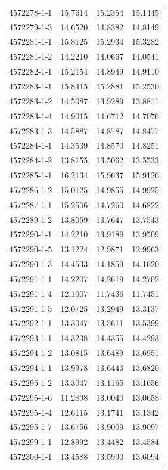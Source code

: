 \begin{longtable}{lrrr}
4572278-1-1 & 15.7614 & 15.2354 & 15.1445 \\
4572279-1-3 & 14.6520 & 14.8382 & 14.8149 \\
4572281-1-1 & 15.8125 & 15.2934 & 15.3282 \\
4572281-1-2 & 14.2210 & 14.0667 & 14.0541 \\
4572282-1-1 & 15.2154 & 14.8949 & 14.9110 \\
4572283-1-1 & 15.8415 & 15.2881 & 15.2530 \\
4572283-1-2 & 14.5087 & 13.9289 & 13.8811 \\
4572283-1-4 & 14.9015 & 14.6712 & 14.7076 \\
4572283-1-3 & 14.5887 & 14.8787 & 14.8477 \\
4572284-1-1 & 14.3539 & 14.8570 & 14.8251 \\
4572284-1-2 & 13.8155 & 13.5062 & 13.5533 \\
4572285-1-1 & 16.2134 & 15.9637 & 15.9126 \\
4572286-1-2 & 15.0125 & 14.9855 & 14.9925 \\
4572287-1-1 & 15.2506 & 14.7260 & 14.6822 \\
4572289-1-2 & 13.8059 & 13.7647 & 13.7543 \\
4572290-1-1 & 14.2210 & 13.9189 & 13.9509 \\
4572290-1-5 & 13.1224 & 12.9871 & 12.9963 \\
4572290-1-3 & 14.4533 & 14.1859 & 14.1620 \\
4572291-1-1 & 14.2207 & 14.2619 & 14.2702 \\
4572291-1-4 & 12.1007 & 11.7436 & 11.7451 \\
4572291-1-5 & 12.0725 & 13.2949 & 13.3137 \\
4572292-1-1 & 13.3047 & 13.5611 & 13.5399 \\
4572293-1-1 & 14.3238 & 14.4355 & 14.4293 \\
4572294-1-2 & 13.0815 & 13.6489 & 13.6951 \\
4572294-1-1 & 13.9978 & 13.6443 & 13.6820 \\
4572295-1-2 & 13.3047 & 13.1165 & 13.1656 \\
4572295-1-6 & 11.2898 & 13.0040 & 13.0658 \\
4572295-1-4 & 12.6115 & 13.1741 & 13.1342 \\
4572295-1-7 & 13.6756 & 13.9009 & 13.9097 \\
4572299-1-1 & 12.8992 & 13.4482 & 13.4584 \\
4572300-1-1 & 13.4588 & 13.5990 & 13.6094 \\

\end{longtable}
